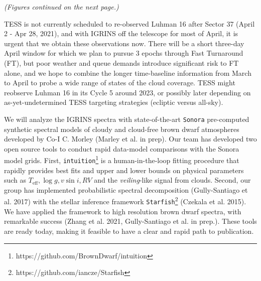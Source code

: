 \documentclass[11pt]{article}
\begin{document}
{\emph{(Figures continued on the next page.)}

\clearpage


%
%
%

\expdesign

TESS is not currently scheduled to re-observed Luhman 16 after Sector 37 (April 2 - Apr 28, 2021), and with IGRINS off the telescope for most of April, it is urgent that we obtain these observations now.  There will be a short three-day April window for which we plan to pursue 3 epochs through Fast Turnaround (FT), but poor weather and queue demands introduce significant risk to FT alone, and we hope to combine the longer time-baseline information from March to April to probe a wide range of states of the cloud coverage.  TESS might reobserve Luhman 16 in its Cycle 5 around 2023, or possibly later depending on as-yet-undetermined TESS targeting strategies (ecliptic versus all-sky).

We will analyze the IGRINS spectra with state-of-the-art \texttt{Sonora} pre-computed synthetic spectral models of cloudy and cloud-free brown dwarf atmospheres developed by Co-I C. Morley (Marley et al. in prep).  Our team has developed two open source tools to conduct rapid data-model comparisons with the Sonora model grids. First, \texttt{intuition}\footnote{https://github.com/BrownDwarf/intuition} is a human-in-the-loop fitting procedure that rapidly provides best fits and upper and lower bounds on physical parameters such as $T_{\mathrm{eff}}, \log{g}, v\sin{i}, RV$ and the \emph{veiling}-like signal from clouds.  Second, our group has implemented probabilistic spectral decomposition (Gully-Santiago et al. 2017) with the stellar inference framework \texttt{Starfish}\footnote{https://github.com/iancze/Starfish} (Czekala et al. 2015).  We have applied the framework to high resolution brown dwarf spectra, with remarkable success (Zhang et al. 2021, Gully-Santiago et al. in prep.).  These tools are ready today, making it feasible to have a clear and rapid path to publication.

}
\end{document}
